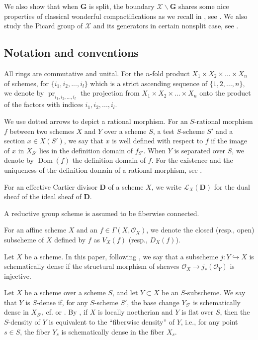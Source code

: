 \documentclass[11pt, reqno]{amsart}
\theoremstyle{plain}
\theoremstyle{definition}
\DeclareMathOperator{\Dom}{Dom} %
\DeclareMathOperator{\pr}{pr}	%
\begin{document}
We also show that when $\mathbf{G}$ is split, the boundary $\mathcal{X\backslash \mathbf{G}}$ shares some nice properties of classical wonderful compactifications as we recall in , see . We also study the Picard group of $\mathcal{X}$ and its generators in certain nonsplit case, see .


\subsection{Notation and conventions}
All rings are commutative and unital. For the $n$-fold product $X_1\times X_2\times...\times X_n$ of schemes, for $\{i_1,i_2,...,i_l\}$ which is a strict ascending sequence of $\{1,2,...,n\}$, we denote by $\pr_{i_1,i_2,...,i_l}$ the projection from $X_1\times X_2\times...\times X_n$ onto the product of the factors with indices $i_1,i_2,...,i_l$. 

We use dotted arrows to depict a rational morphism. For an $S$-rational morphism $f$ between two schemes $X$ and $Y$ over a scheme $S$, a test $S$-scheme $S'$ and a section $x\in X(S')$, we say that $x$ is well defined with respect to $f$ if the image of $x$ in $X_{S'}$ lies in the definition domain of $f_{S'}$. When $Y$ is separated over $S$, we denote by $\Dom(f)$ the definition domain of $f$. For the existence and the uniqueness of the definition domain of a rational morphism, see \cite[exposé~XVIII, définition~1.5.1]{SGA3II}.

For an effective Cartier divisor $\mathbf{D}$ of a scheme $X$, we write $\mathcal{L}_{X}(\mathbf{D})$ for the dual sheaf of the ideal sheaf of $\mathbf{D}$. 

A reductive group scheme is assumed to be fiberwise connected. 

For an affine scheme $X$ and an $f\in\Gamma (X,\mathcal{O}_X)$, we denote the closed (resp., open) subscheme of $X$ defined by $f$ as $V_X(f)$ (resp., $D_X(f)$).

Let $X$ be a scheme. In this paper, following \cite[définition~11.10.2]{EGAIV3}, we say that a subscheme $j:Y\hookrightarrow X$ is schematically dense if the structural morphism of sheaves $\mathcal{O}_X\rightarrow j_*(\mathcal{O}_Y)$ is injective.

Let $X$ be a scheme over a scheme $S$, and let $Y\subset X$ be an $S$-subscheme. We say that $Y$ is $S$-dense if, for any $S$-scheme $S'$, the base change $Y_{S'}$ is schematically dense in $X_{S'}$, cf. \cite[définition~11.10.8]{EGAIV3} or \cite[exposé~XVIII, \S~1]{SGA3II}. By \cite[théorème~11.10.9]{EGAIV3}, if $X$ is locally noetherian and $Y$ is flat over $S$, then the $S$-density of $Y$ is equivalent to the ``fiberwise density'' of $Y$, i.e., for any point $s\in S$, the fiber $Y_s$ is schematically dense in the fiber $X_s$. 
\end{document}

